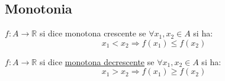 \documentclass[../main.tex, class=article, 12pt]{subfiles}
\begin{document}
\subsection{Monotonia}\label{sec:monotonia}
\begin{definition}
        $ f:A \to \mathbb{R} $ si dice monotona crescente se $ \forall x_1,x_2 \in A$ si ha:
        \begin{equation*}
                x_1 < x_2 \Rightarrow f(x_1) \le f(x_2)
        \end{equation*}
\end{definition}
\begin{definition}
        $ f:A \to \mathbb{R} $ si dice \underline{monotona decrescente} se $ \forall x_1,x_2 \in A$ si ha:
        \begin{equation*}
                x_1 > x_2 \Rightarrow f(x_1) \ge f(x_2)
        \end{equation*}
\end{definition}
\end{document}
